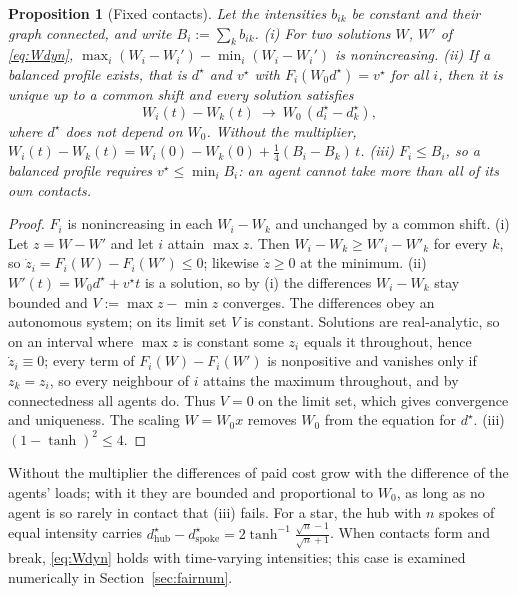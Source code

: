 \documentclass[11pt]{article}
\newtheorem{proposition}[theorem]{Proposition}
\theoremstyle{definition}
\theoremstyle{remark}
\begin{document}
\begin{proposition}[Fixed contacts]\label{prop:fairconv}
Let the intensities $b_{ik}$ be constant and their graph connected, and write $B_i:=\sum_kb_{ik}$.
(i) For two solutions $W$, $W'$ of \eqref{eq:Wdyn}, $\max_i(W_i-W_i')-\min_i(W_i-W_i')$ is nonincreasing.
(ii) If a balanced profile exists, that is $d^\star$ and $v^\star$ with $F_i(W_0d^\star)=v^\star$ for all $i$, then it is unique up to a common shift and every solution satisfies
\[
W_i(t)-W_k(t)\ \longrightarrow\ W_0\,(d^\star_i-d^\star_k),
\]
where $d^\star$ does not depend on $W_0$. Without the multiplier, $W_i(t)-W_k(t)=W_i(0)-W_k(0)+\frac14(B_i-B_k)\,t$.
(iii) $F_i\le B_i$, so a balanced profile requires $v^\star\le\min_iB_i$: an agent cannot take more than all of its own contacts.
\end{proposition}
\begin{proof}
$F_i$ is nonincreasing in each $W_i-W_k$ and unchanged by a common shift. (i) Let $z=W-W'$ and let $i$ attain $\max z$. Then $W_i-W_k\ge W'_i-W'_k$ for every $k$, so $\dot z_i=F_i(W)-F_i(W')\le0$; likewise $\dot z\ge0$ at the minimum. (ii) $W'(t)=W_0d^\star+v^\star t$ is a solution, so by (i) the differences $W_i-W_k$ stay bounded and $V:=\max z-\min z$ converges. The differences obey an autonomous system; on its limit set $V$ is constant. Solutions are real-analytic, so on an interval where $\max z$ is constant some $z_i$ equals it throughout, hence $\dot z_i\equiv0$; every term of $F_i(W)-F_i(W')$ is nonpositive and vanishes only if $z_k=z_i$, so every neighbour of $i$ attains the maximum throughout, and by connectedness all agents do. Thus $V=0$ on the limit set, which gives convergence and uniqueness. The scaling $W=W_0x$ removes $W_0$ from the equation for $d^\star$. (iii) $(1-\tanh)^2\le4$.
\end{proof}

Without the multiplier the differences of paid cost grow with the difference of the agents' loads; with it they are bounded and proportional to $W_0$, as long as no agent is so rarely in contact that (iii) fails. For a star, the hub with $n$ spokes of equal intensity carries $d^\star_{\mathrm{hub}}-d^\star_{\mathrm{spoke}}=2\tanh^{-1}\frac{\sqrt n-1}{\sqrt n+1}$. When contacts form and break, \eqref{eq:Wdyn} holds with time-varying intensities; this case is examined numerically in Section~\ref{sec:fairnum}.
\end{document}
